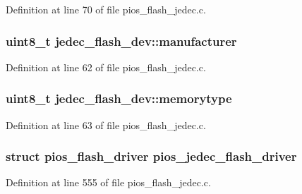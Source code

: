 \-Definition at line 70 of file pios\-\_\-flash\-\_\-jedec.\-c.

\hypertarget{group___p_i_o_s___f_l_a_s_h_gaf7bb5593bcefe3837116c4bdb768cd6e}{
\subsubsection[{manufacturer}]{\setlength{\rightskip}{0pt plus 5cm}uint8\-\_\-t {\bf jedec\-\_\-flash\-\_\-dev\-::manufacturer}}}\label{group___p_i_o_s___f_l_a_s_h_gaf7bb5593bcefe3837116c4bdb768cd6e}


\-Definition at line 62 of file pios\-\_\-flash\-\_\-jedec.\-c.

\hypertarget{group___p_i_o_s___f_l_a_s_h_ga68ce126b7f544ebb02fa8beab9b9faa2}{
\subsubsection[{memorytype}]{\setlength{\rightskip}{0pt plus 5cm}uint8\-\_\-t {\bf jedec\-\_\-flash\-\_\-dev\-::memorytype}}}\label{group___p_i_o_s___f_l_a_s_h_ga68ce126b7f544ebb02fa8beab9b9faa2}


\-Definition at line 63 of file pios\-\_\-flash\-\_\-jedec.\-c.

\hypertarget{group___p_i_o_s___f_l_a_s_h_gab3923a09f07a535164fd799434276f27}{
\subsubsection[{pios\-\_\-jedec\-\_\-flash\-\_\-driver}]{\setlength{\rightskip}{0pt plus 5cm}struct {\bf pios\-\_\-flash\-\_\-driver} {\bf pios\-\_\-jedec\-\_\-flash\-\_\-driver}}}\label{group___p_i_o_s___f_l_a_s_h_gab3923a09f07a535164fd799434276f27}


\-Definition at line 555 of file pios\-\_\-flash\-\_\-jedec.\-c.

